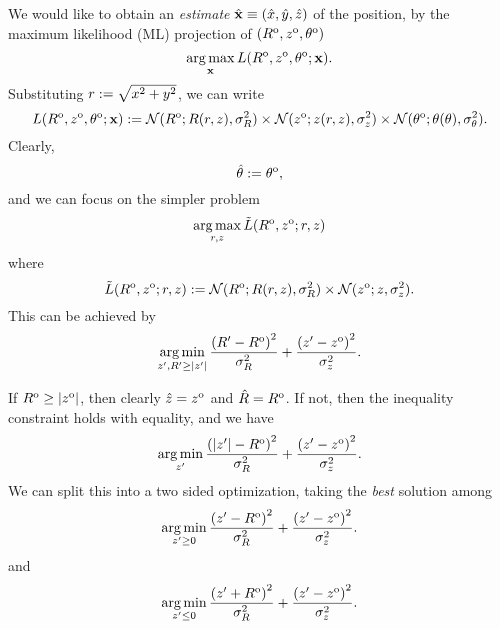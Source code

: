 \documentclass[a4paper,10pt]{article}
\begin{document}
We would like to obtain an \emph{estimate} $\hat{{\bf x}} \equiv (\hat{x},\hat{y},\hat{z})$ of the position,
by the maximum likelihood (ML) projection of ${(R^{\text{o}},z^{\text{o}},\theta^{\text{o}})}$
\[
\operatorname*{arg\,max}_{\bf x} L(R^{\text{o}},z^{\text{o}},\theta^{\text{o}} ; {\bf x} ).
\]
%
\newcommand{\xyrad}{r}
Substituting $\xyrad := \sqrt{ \xvar^2 + \yvar^2 }$,
we can write
\[
  \likelihood(\slrange^\obs,\altitude^\obs,\bearing^\obs ; \pos ) :=
  \normpdf( \slrange^\obs ; \slrange(\xyrad,\zvar), \noisevar_\slrange )
  \times
  \normpdf( \altitude^\obs ; \altitude(\xyrad,\zvar), \noisevar_\altitude )
  \times
  \normpdf( \bearing^\obs ; \bearing(\bearing), \noisevar_\bearing ).
\]
Clearly,
\[
  \hat{\theta} := \theta^{\text{o}},
\]
and we can focus on the simpler problem
\[
  \argmax_{\xyrad,\zvar} \tilde\likelihood(\slrange^\obs,\altitude^\obs ; \xyrad, \zvar )
\]
where
\[
  \tilde\likelihood(\slrange^\obs,\altitude^\obs ; \xyrad, \zvar ) 
  :=
  \normpdf( \slrange^\obs ; \slrange(\xyrad,\zvar), \noisevar_\slrange )
  \times
  \normpdf( \altitude^\obs ; \zvar, \noisevar_\altitude ).
\]
%
This can be achieved by
\[
  \operatorname*{arg\,min}_{z', R' \geq |z'|}
  \frac{ \left( R' - R^{\text{o}}  \right)^2 }{ \sigma^2_R }
  +
  \frac{ \left(  z' - z^{\text{o}} \right)^2 }{ \sigma^2_z }.
\]

If $R^{\text{o}} \geq |z^{\text{o}}|$, then clearly $\hat{z} = z^{\text{o}}$
and $\hat{R} = R^{\text{o}}$.
%
If not, then the inequality constraint holds with equality,
and we have
\[
  \operatorname*{arg\,min}_{z'}
  \frac{ \left( |z'| - R^{\text{o}} \right)^2 }{ \sigma^2_R }
  +
  \frac{ \left(  z'  - z^{\text{o}} \right)^2 }{ \sigma^2_z }.
\]
%
We can split this into a two sided optimization,
taking the \emph{best} solution among
\[
  \operatorname*{arg\,min}_{z' \geq 0 }
  \frac{ \left( z' - R^{\text{o}} \right)^2 }{ \sigma^2_R }
  +
  \frac{ \left(  z'  - z^{\text{o}} \right)^2 }{ \sigma^2_z }.
\]
%
and
%
\[
  \operatorname*{arg\,min}_{z' \leq 0 }
  \frac{ \left( z' + R^{\text{o}} \right)^2 }{ \sigma^2_R }
  +
  \frac{ \left(  z'  - z^{\text{o}} \right)^2 }{ \sigma^2_z }.
\]
\end{document}
